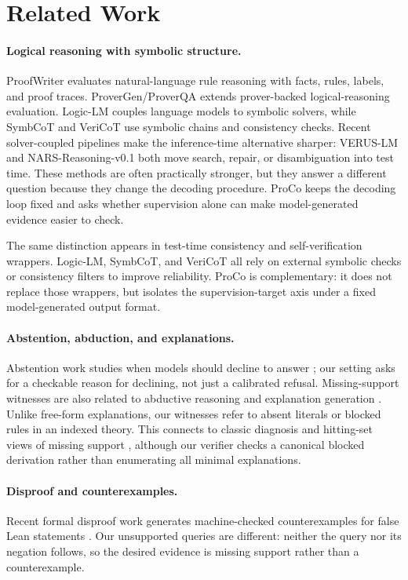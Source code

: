 \section{Related Work}
\label{sec:related}

\paragraph{Logical reasoning with symbolic structure.}
ProofWriter \citep{tafjord2020proofwriter} evaluates natural-language rule
reasoning with facts, rules, labels, and proof traces. ProverGen/ProverQA
\citep{qi2025provergen} extends prover-backed logical-reasoning evaluation.
Logic-LM \citep{pan2023logiclm} couples language models to symbolic solvers,
while SymbCoT \citep{xu2024symbcot} and VeriCoT \citep{feng2025vericot} use
symbolic chains and consistency checks. Recent solver-coupled pipelines make
the inference-time alternative sharper: VERUS-LM \citep{callewaert2025veruslm}
and NARS-Reasoning-v0.1 \citep{gabriel2026nars} both move search, repair, or
disambiguation into test time. These methods are often practically stronger,
but they answer a different question because they change the decoding
procedure. ProCo keeps the decoding loop fixed and asks whether supervision
alone can make model-generated evidence easier to check.

The same distinction appears in test-time consistency and self-verification
wrappers. Logic-LM, SymbCoT, and VeriCoT all rely on external symbolic checks or
consistency filters to improve reliability. ProCo is complementary: it does not
replace those wrappers, but isolates the supervision-target axis under a fixed
model-generated output format.

\paragraph{Abstention, abduction, and explanations.}
Abstention work studies when models should decline to answer
\citep{madhusudhan2025abstention}; our setting asks for a checkable reason for
declining, not just a calibrated refusal. Missing-support witnesses are also
related to abductive reasoning and explanation generation
\citep{bhagavatula2020abductive,camburu2018esnli}. Unlike free-form
explanations, our witnesses refer to absent literals or blocked rules in an
indexed theory. This connects to classic diagnosis and hitting-set views of
missing support \citep{reiter1987diagnosis}, although our verifier checks a
canonical blocked derivation rather than enumerating all minimal explanations.

\paragraph{Disproof and counterexamples.}
Recent formal disproof work generates machine-checked counterexamples for false
Lean statements \citep{li2026learningtodisprove}. Our unsupported queries are
different: neither the query nor its negation follows, so the desired evidence
is missing support rather than a counterexample.
